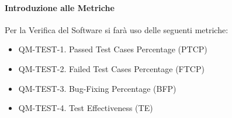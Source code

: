 		\paragraph{Introduzione alle Metriche}

			Per la Verifica del Software si farà uso delle seguenti metriche:

			\begin{itemize}
				\item QM-TEST-1. Passed Test Cases Percentage (PTCP)
				\item QM-TEST-2. Failed Test Cases Percentage (FTCP)
				\item QM-TEST-3. Bug-Fixing Percentage (BFP)
				\item QM-TEST-4. Test Effectiveness (TE)
			\end{itemize}








